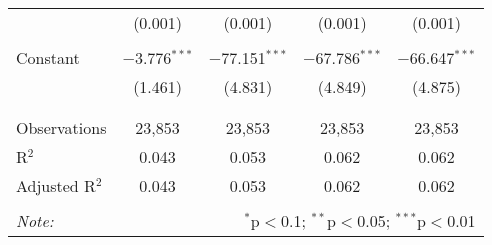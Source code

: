 \begin{table}[!htbp]
\begin{tabular}{@{\extracolsep{-5pt}}lcccc}
  & (0.001) & (0.001) & (0.001) & (0.001) \\ 
  & & & & \\ 
 Constant & $-$3.776$^{***}$ & $-$77.151$^{***}$ & $-$67.786$^{***}$ & $-$66.647$^{***}$ \\ 
  & (1.461) & (4.831) & (4.849) & (4.875) \\ 
  & & & & \\ 
\hline \\[-1.8ex] 
Observations & 23,853 & 23,853 & 23,853 & 23,853 \\ 
R$^{2}$ & 0.043 & 0.053 & 0.062 & 0.062 \\ 
Adjusted R$^{2}$ & 0.043 & 0.053 & 0.062 & 0.062 \\ 
\hline 
\hline \\[-1.8ex] 
\textit{Note:}  & \multicolumn{4}{r}{$^{*}$p$<$0.1; $^{**}$p$<$0.05; $^{***}$p$<$0.01} \\ 
\end{tabular} 
\end{table} 
